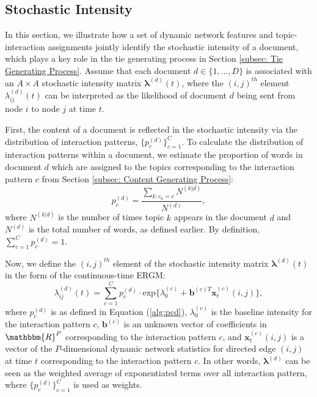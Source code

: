 \documentclass[a4paper]{article}
\begin{document}
\subsection{Stochastic Intensity} \label{subsec: Stochastic Intensity}
In this section, we illustrate how a set of dynamic network features and topic-interaction assignments jointly identify the stochastic intensity of a document, which plays a key role in the tie generating process in Section \ref{subsec: Tie Generating Process}. Assume that each document $d \in \{1,...,D\}$ is associated with an $A\times A$ stochastic intensity matrix $\boldsymbol{\lambda}^{(d)}(t)$, where the $(i, j)^{th}$ element $\lambda^{(d)}_{ij}(t)$ can be interpreted as the likelihood of document $d$ being sent from node $i$ to node $j$ at time $t$.  

First, the content of a document is reflected in the stochastic intensity via the distribution of interaction patterns, $\{p_c^{(d)}\}_{c=1}^C$. To calculate the distribution of interaction patterns within a document, we estimate the proportion of words in document $d$ which are assigned to the topics corresponding to the interaction pattern $c$ from Section \ref{subsec: Content Generating Process}: 
\begin{equation}
p_c^{(d)} = \frac{\sum\limits_{k: c_k=c} N^{(k|d)}}{N^{(d)}},
	\label{alg:pcd}
\end{equation}
where $N^{(k|d)}$ is the number of times topic $k$ appears in the document $d$ and $N^{(d)}$ is the total number of words, as defined earlier. By definition, $\sum\limits_{c=1}^{C}p_c^{(d)}=1$.

Now, we define the $(i, j)^{th}$ element of the stochastic intensity matrix $\boldsymbol{\lambda}^{(d)}(t)$ in the form of the continuous-time ERGM:
\begin{equation}
\lambda^{(d)}_{ij}(t)=\sum\limits_{c=1}^{C} p^{(d)}_c
\cdot  \mbox{exp}\Big\{\lambda^{(c)}_0 + \boldsymbol{b}^{(c)T}\boldsymbol{x}^{(c)}_t(i, j)\Big\},
	\label{alg:lambdad}
\end{equation}
where $p_c^{(d)}$ is as defined in Equation (\ref{alg:pcd}), $\lambda^{(c)}_0$ is the baseline intensity for the interaction pattern $c$, $\boldsymbol{b}^{(c)}$ is an unknown vector of coefficients in $\mathbbm{R}^{P}$ corresponding to the interaction pattern $c$, and $\boldsymbol{x}^{(c)}_t(i, j)$ is a vector of the $P$-dimensional dynamic network statistics for directed edge $(i, j)$ at time $t$ corresponding to the interaction pattern $c$. In other words, $\boldsymbol{\lambda}^{(d)}$ can be seen as the weighted average of exponentiated terms over all interaction pattern, where $\{p_c^{(d)}\}_{c=1}^C$ is used as weights. 
\end{document}
